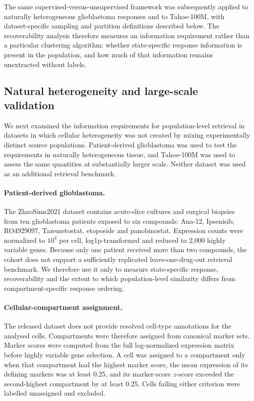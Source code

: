 \documentclass[11pt,letterpaper]{article}
\begin{document}
The same supervised-versus-unsupervised framework was subsequently applied to naturally
heterogeneous glioblastoma responses and to Tahoe-100M, with dataset-specific sampling and
partition definitions described below. The recoverability analysis therefore measures an
information requirement rather than a particular clustering algorithm: whether state-specific
response information is present in the population, and how much of that information remains
unextracted without labels.




\subsection*{Natural heterogeneity and large-scale validation}

We next examined the information requirements for population-level retrieval in datasets in which
cellular heterogeneity was not created by mixing experimentally distinct source populations.
Patient-derived glioblastoma was used to test the requirements in naturally heterogeneous tissue,
and Tahoe-100M was used to assess the same quantities at substantially larger scale. Neither
dataset was used as an additional retrieval benchmark.

\paragraph{Patient-derived glioblastoma.}
The ZhaoSims2021 dataset contains acute-slice cultures and surgical biopsies from ten glioblastoma
patients exposed to six compounds: Ana-12, Ipsenisib, RO4929097, Tazemetostat, etoposide and
panobinostat. Expression counts were normalized to $10^4$ per cell, log1p-transformed and reduced
to 2,000 highly variable genes. Because only one patient received more than two compounds, the
cohort does not support a sufficiently replicated leave-one-drug-out retrieval benchmark. We
therefore use it only to measure state-specific response, recoverability and the extent to which
population-level similarity differs from compartment-specific response ordering.

\paragraph{Cellular-compartment assignment.}
The released dataset does not provide resolved cell-type annotations for the analysed cells.
Compartments were therefore assigned from canonical marker sets. Marker scores were computed from
the full log-normalized expression matrix before highly variable gene selection. A cell was assigned
to a compartment only when that compartment had the highest marker score, the mean expression of
its defining markers was at least 0.25, and its marker-score $z$-score exceeded the second-highest
compartment by at least 0.25. Cells failing either criterion were labelled unassigned and excluded.
\end{document}
